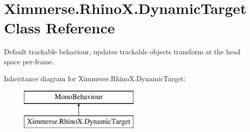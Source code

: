 \hypertarget{class_ximmerse_1_1_rhino_x_1_1_dynamic_target}{}\section{Ximmerse.\+Rhino\+X.\+Dynamic\+Target Class Reference}
\label{class_ximmerse_1_1_rhino_x_1_1_dynamic_target}


Default trackable behaviour, updates trackable object\textquotesingle{}s transform at the head space per-\/frame.  


Inheritance diagram for Ximmerse.\+Rhino\+X.\+Dynamic\+Target\+:\begin{figure}[H]
\begin{center}
\leavevmode
\includegraphics[height=2.000000cm]{class_ximmerse_1_1_rhino_x_1_1_dynamic_target}
\end{center}
\end{figure}
